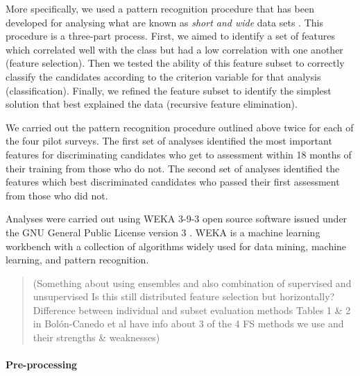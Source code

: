 \documentclass[a4paper,]{book}
\let\oldparagraph\paragraph
\renewcommand{\paragraph}[1]{\oldparagraph{#1}\mbox{}}
\begin{document}
More specifically, we used a pattern recognition procedure that has been developed for analysing what are known as \emph{short and wide} data sets \citep[i.e., data sets that contain more variables than cases;][]{Jones2017a}. This procedure is a three-part process. First, we aimed to identify a set of features which correlated well with the class but had a low correlation with one another (feature selection). Then we tested the ability of this feature subset to correctly classify the candidates according to the criterion variable for that analysis (classification). Finally, we refined the feature subset to identify the simplest solution that best explained the data (recursive feature elimination).

We carried out the pattern recognition procedure outlined above twice for each of the four pilot surveys. The first set of analyses identified the most important features for discriminating candidates who get to assessment within 18 months of their training from those who do not. The second set of analyses identified the features which best discriminated candidates who passed their first assessment from those who did not.

Analyses were carried out using WEKA 3-9-3 open source software issued under the GNU General Public License version 3 \citep{Bouckaert2018, Frank2016}. WEKA is a machine learning workbench with a collection of algorithms widely used for data mining, machine learning, and pattern recognition.

\begin{quote}
(Something about using ensembles \citep{Bolon-Canedo2012, Bolon-Canedo2014} and also combination of supervised and unsupervised
Is this still distributed feature selection but horizontally?
Difference between individual and subset evaluation methods
Tables 1 \& 2 in Bolón-Canedo et al \citeyearpar{Bolon-Canedo2015} have info about 3 of the 4 FS methods we use and their strengths \& weaknesses)
\end{quote}

\hypertarget{pre-processing}{%
\paragraph{Pre-processing}\label{pre-processing}}
\end{document}
